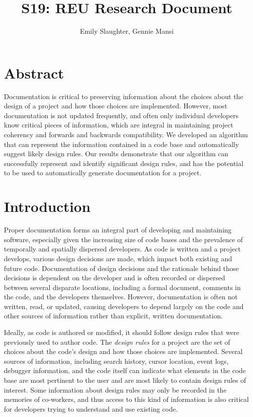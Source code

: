 \documentclass[12pt]{article}
\title{S19: REU Research Document}
\author{Emily Slaughter, Gennie Mansi }
\begin{document}
\maketitle

\clearpage

\tableofcontents

\clearpage

\section{Abstract} \label{abstract}

Documentation is critical to preserving information about the choices about the design of a project and how those choices are implemented. However, most documentation is not updated frequently, and often only individual developers know critical pieces of information, which are integral in maintaining project coherency and forwards and backwards compatibility.  We developed an algorithm that can represent the information contained in a code base and automatically suggest likely design rules. Our results demonstrate that our algorithm can successfully represent and identify significant design rules, and has the potential to be used to automatically generate documentation for a project.



\clearpage
\section{Introduction} \label{intro}

Proper documentation forms an integral part of developing and maintaining software, especially given the increasing size of code bases and the prevalence of temporally and spatially dispersed developers. As code is written and a project develops, various design decisions are made, which impact both existing and future code. Documentation of design decisions and the rationale behind those decisions is dependent on the developer and is often recorded or dispersed between several disparate locations, including a formal document, comments in the code, and the developers themselves. However, documentation is often not written, read, or updated, causing developers to depend largely on the code and other sources of information rather than explicit, written documentation. 

Ideally, as code is authored or modified, it should follow design rules that were previously used to author code. The \textit{design rules} for a project are the set of choices about the code's design and how those choices are implemented. Several sources of information, including search history, cursor location, event logs, debugger information, and the code itself can indicate what elements in the code base are most pertinent to the user and are most likely to contain design rules of interest. Some information about design rules may only be recorded in the memories of co-workers, and thus access to this kind of information is also critical for developers trying to understand and use existing code. 
\end{document}

